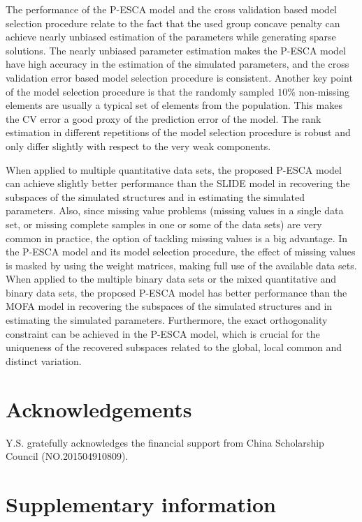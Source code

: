 The performance of the P-ESCA model and the cross validation based model selection procedure relate to the fact that the used group concave penalty can achieve nearly unbiased estimation of the parameters while generating sparse solutions. The nearly unbiased parameter estimation makes the P-ESCA model have high accuracy in the estimation of the simulated parameters, and the cross validation error based model selection procedure is consistent. Another key point of the model selection procedure is that the randomly sampled $10\%$ non-missing elements are usually a typical set of elements from the population. This makes the CV error a good proxy of the prediction error of the model. The rank estimation in different repetitions of the model selection procedure is robust and only differ slightly with respect to the very weak components.

When applied to multiple quantitative data sets, the proposed P-ESCA model can achieve slightly better performance than the SLIDE model in recovering the subspaces of the simulated structures and in estimating the simulated parameters. Also, since missing value problems (missing values in a single data set, or missing complete samples in one or some of the data sets) are very common in practice, the option of tackling missing values is a big advantage. In the P-ESCA model and its model selection procedure, the effect of missing values is masked by using the weight matrices, making full use of the available data sets. When applied to the multiple binary data sets or the mixed quantitative and binary data sets, the proposed P-ESCA model has better performance than the MOFA model in recovering the subspaces of the simulated structures and in estimating the simulated parameters. Furthermore, the exact orthogonality constraint can be achieved in the P-ESCA model, which is crucial for the uniqueness of the recovered subspaces related to the global, local common and distinct variation.

\section*{Acknowledgements}
Y.S. gratefully acknowledges the financial support from China Scholarship Council (NO.201504910809).

\clearpage
\section{Supplementary information}

